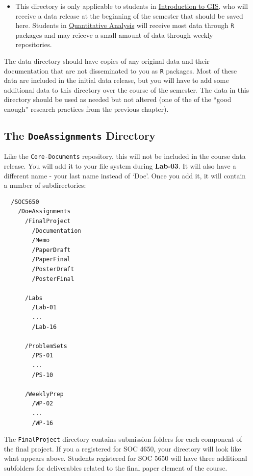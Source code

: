 \documentclass[]{book}
\newenvironment{rmdblock}[1]
  {\begin{shaded*}
  \begin{itemize}
  \renewcommand{\labelitemi}{
    \raisebox{-.7\height}[0pt][0pt]{
      {\setkeys{Gin}{width=3em,keepaspectratio}\texttt{[image: images/\#1]}}
    }
  }
  \item
  }
  {
  \end{itemize}
  \end{shaded*}
  }
\newenvironment{rmdwarning}
  {\begin{rmdblock}{warning}}
  {\end{rmdblock}}
\theoremstyle{definition}
\theoremstyle{definition}
\theoremstyle{definition}
\theoremstyle{remark}
\begin{document}
\begin{rmdwarning}
This directory is only applicable to students in
\href{https://slu-soc5650.github.io}{Introduction to GIS}, who will
receive a data release at the beginning of the semester that should be
saved here. Students in
\href{https://slu-soc5050.github.io}{Quantitative Analysis} will receive
most data through \texttt{R} packages and may reiceve a small amount of
data through weekly repositories.
\end{rmdwarning}

The data directory should have copies of any original data and their
documentation that are not disseminated to you as \texttt{R} packages.
Most of these data are included in the initial data release, but you
will have to add some additional data to this directory over the course
of the semester. The data in this directory should be used as needed but
not altered (one of the of the ``good enough'' research practices from
the previous chapter).

\subsection{\texorpdfstring{The \texttt{DoeAssignments}
Directory}{The DoeAssignments Directory}}\label{the-doeassignments-directory}

Like the \texttt{Core-Documents} repository, this will not be included
in the course data release. You will add it to your file system during
\textbf{Lab-03}. It will also have a different name - your last name
instead of `Doe'. Once you add it, it will contain a number of
subdirectories:

\begin{verbatim}
  /SOC5650
    /DoeAssignments
      /FinalProject
        /Documentation
        /Memo
        /PaperDraft
        /PaperFinal
        /PosterDraft
        /PosterFinal

      /Labs
        /Lab-01
        ...
        /Lab-16

      /ProblemSets
        /PS-01
        ...
        /PS-10
      
      /WeeklyPrep
        /WP-02
        ...
        /WP-16
\end{verbatim}

The \texttt{FinalProject} directory contains submission folders for each
component of the final project. If you a registered for SOC 4650, your
directory will look like what appears above. Students registered for SOC
5650 will have three additional subfolders for deliverables related to
the final paper element of the course.
\end{document}
